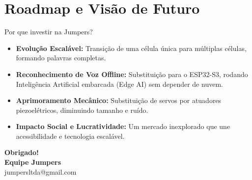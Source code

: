 \documentclass[aspectratio=169]{beamer} %
\begin{document}
\section{Roadmap e Visão de Futuro}
\begin{frame}{Por que investir na Jumpers?}
  \begin{itemize}
    \item \textbf{Evolução Escalável:} Transição de uma célula única para múltiplas células, formando palavras completas.
    \item \textbf{Reconhecimento de Voz Offline:} Substituição para o ESP32-S3, rodando Inteligência Artificial embarcada (Edge AI) sem depender de nuvem.
    \item \textbf{Aprimoramento Mecânico:} Substituição de servos por atuadores piezoelétricos, diminuindo tamanho e ruído.
    \item \textbf{Impacto Social e Lucratividade:} Um mercado inexplorado que une acessibilidade e tecnologia escalável.
  \end{itemize}
\end{frame}

\begin{frame}
  \centering
  \Huge \textbf{Obrigado!}\\
  \vspace{1cm}
  \Large \textbf{Equipe Jumpers}\\
  \normalsize jumpersltda@gmail.com
\end{frame}
\end{document}
